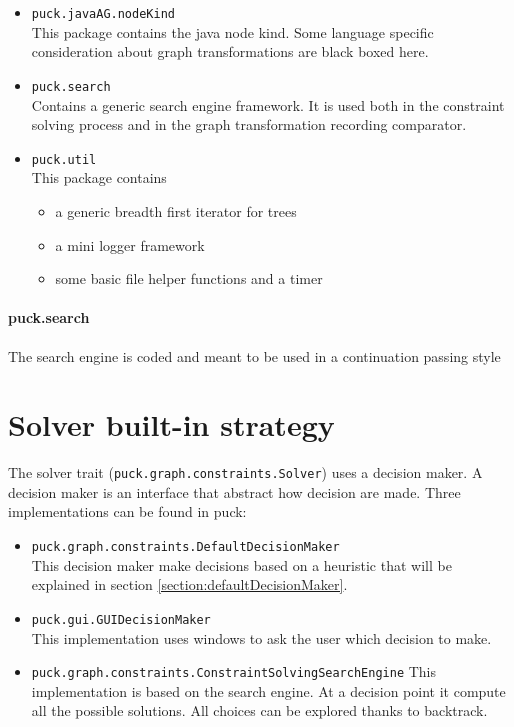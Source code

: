 \documentclass[]{article}
\begin{document}
\begin{itemize}
\item \verb|puck.javaAG.nodeKind|\\
	This package contains the java node kind. Some language specific consideration about graph transformations are black boxed here.

\item \verb|puck.search|\\
	Contains a generic search engine framework. It is used both in the constraint solving process and in the graph transformation recording comparator.

\item \verb|puck.util|\\
This package contains 
\begin{itemize}
\item a generic breadth first iterator for trees
\item a mini logger framework
\item some basic file helper functions and a timer
\end{itemize}
\end{itemize}


\paragraph{puck.search} The search engine is coded and meant to be used in a continuation passing style

\section{Solver built-in strategy}
The solver trait (\verb|puck.graph.constraints.Solver|) uses a decision maker. A decision maker is an interface that abstract how decision are made. Three implementations can be found in puck:
\begin{itemize}
	\item \verb|puck.graph.constraints.DefaultDecisionMaker|\\
	This decision maker make decisions based on a heuristic that will be explained in section \ref{section:defaultDecisionMaker}.
	\item \verb|puck.gui.GUIDecisionMaker|\\
	This implementation uses windows to ask the user which decision to make. 
	\item \verb|puck.graph.constraints.ConstraintSolvingSearchEngine|
	This implementation is based on the search engine. At a decision point it compute all the possible solutions. All choices can be explored thanks to backtrack.
\end{itemize}
\end{document}
